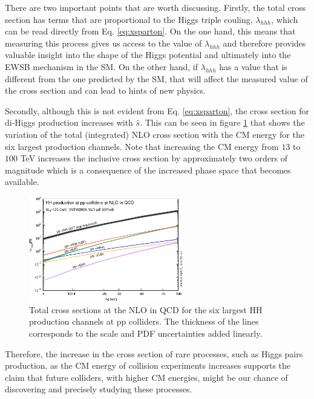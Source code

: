 There are two important points that are worth discussing. Firstly, the total cross section has terms that are proportional to the Higgs triple couling, $\lambda_{hhh}$, which can be read directly from Eq. \ref{eq:xsparton}. On the one hand, this means that measuring this process gives us access to the value of $\lambda_{hhh}$ and therefore provides valuable insight into the shape of the Higgs potential and ultimately into the EWSB mechanism in the SM. On the other hand, if $\lambda_{hhh}$ has a value that is different from the one predicted by the SM, that will affect the measured value of the cross section and can lead to hints of new physics. 

Secondly, although this is not evident from Eq. \ref{eq:xsparton}, the cross section for di-Higgs production increases with $\hat{s}$. This can be seen in figure \ref{fig:HHxs_s} that shows the variation of the total (integrated) NLO cross section with the CM energy for the six largest production channels. Note that increasing the CM energy from $13$ to $100$ TeV increases the inclusive cross section by approximately two orders of magnitude which is a consequence of the increased phase space that becomes available.

\begin{figure}[]
	\centering
	\includegraphics[width=0.6\textwidth]{./Figures/HH-xsec.png}
	\caption{Total cross sections at the NLO in QCD for the six largest HH production channels at pp colliders. The thickness of the lines corresponds to the scale and PDF uncertainties added linearly.}
	\label{fig:HHxs_s}
\end{figure}

Therefore, the increase in the cross section of rare processes, such as Higgs pairs production, as the CM energy of collision experiments increases supports the claim that future colliders, with higher CM energies, might be our chance of discovering and precisely studying these processes.

